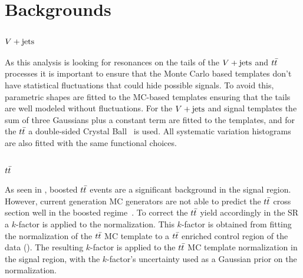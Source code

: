\section{Backgrounds}\label{sec:analysis_backgrounds}

\subsection{$V + \text{jets}$}

As this analysis is looking for resonances on the tails of the $V + \text{jets}$ and $t\bar{t}$ processes it is important to ensure that the Monte Carlo based templates don't have statistical fluctuations that could hide possible signals.
To avoid this, parametric shapes are fitted to the MC-based templates ensuring that the tails are well modeled without fluctuations.
For the $V + \text{jets}$ and signal templates the sum of three Gaussians plus a constant term are fitted to the templates, and for the $t\bar{t}$ a double-sided Crystal Ball~\cite{Gaiser:1982yw} is used.
All systematic variation histograms are also fitted with the same functional choices.

\subsection{$t\bar{t}$}\label{sec:ttbar}

As seen in , boosted $t\bar{t}$ events are a significant background in the signal region.
However, current generation MC generators are not able to predict the $t\bar{t}$ cross section well in the boosted regime~\cite{ATL-PHYS-PUB-2018-009}.
To correct the $t\bar{t}$ yield accordingly in the SR a $k$-factor is applied to the normalization.
This $k$-factor is obtained from fitting the normalization of the $t\bar{t}$ MC template to a $t\bar{t}$ enriched control region of the data (\CRttbar{}).
The resulting $k$-factor is applied to the $t\bar{t}$ MC template normalization in the signal region, with the $k$-factor's uncertainty used as a Gaussian prior on the normalization.

